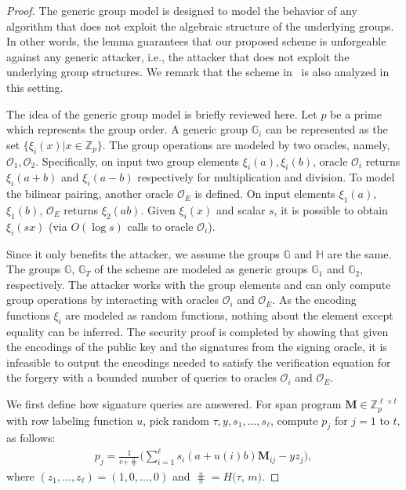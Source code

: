 \begin{proof}
  The generic group model is designed to model the behavior of any algorithm that does not exploit the algebraic structure of the underlying groups. In other words, the lemma guarantees that our proposed scheme is unforgeable against any generic attacker, i.e., the attacker that does not exploit the underlying group structures. We remark that the scheme in~\cite{10.1007/978-3-642-19074-2_24} is also analyzed in this setting.

  The idea of the generic group model is briefly reviewed here. Let $p$ be a prime which represents the group order. A generic group $\mathbb{G}_i$ can be represented as the set $\{\xi_i(x)| x\in\mathbb{Z}_p\}$. The group operations are modeled by two oracles, namely, $\mathcal{O}_1, \mathcal{O}_2$. Specifically, on input two group elements $\xi_i(a), \xi_i(b)$, oracle $\mathcal{O}_i$ returns $\xi_i(a+b)$ and $\xi_i(a-b)$ respectively for multiplication and division. To model the bilinear pairing, another oracle $\mathcal{O}_E$ is defined. On input elements $\xi_1(a)$, $\xi_1(b)$, $\mathcal{O}_E$ returns $\xi_2(ab)$. Given $\xi_i(x)$ and scalar $s$, it is possible to obtain $\xi_i(sx)$ (via $O(\log s)$ calls to oracle $\mathcal{O}_i$).

  Since it only benefits the attacker, we assume the groups $\mathbb{G}$ and $\mathbb{H}$ are the same. The groups $\mathbb{G}$, $\mathbb{G}_T$ of the scheme are modeled as generic groups $\mathbb{G}_1$ and $\mathbb{G}_2$, respectively. The attacker works with the group elements and can only compute group operations by interacting with oracles $\mathcal{O}_i$ and $\mathcal{O}_E$. As the encoding functions $\xi_i$ are modeled as random functions, nothing about the element except equality can be inferred. The security proof is completed by showing that given the encodings of the public key and the signatures from the signing oracle, it is infeasible to output the encodings needed to satisfy the verification equation for the forgery with a bounded number of queries to oracles $\mathcal{O}_i$ and $\mathcal{O}_E$.

  We first define how signature queries are answered. For span program $\mathbf{M}\in \mathbb{Z}_p^{\ell \times t}$ with row labeling function $u$, pick random $\tau, y, s_1, \dots, s_\ell$, compute $p_j$ for $j=1$ to $t$, as follows:
  \begin{align*}
    p_j = \frac{1}{c + \hash}\big(\sum_{i=1}^\ell s_i (a+u(i)b)\mathbf{M}_{ij} - yz_j\big),
  \end{align*}
  where $(z_1, \dots, z_\ell) = (1, 0, \dots, 0)$ and $\hash = H(\tau$, $m)$.


\end{proof}
